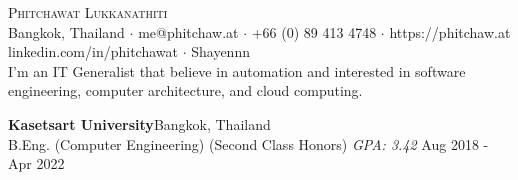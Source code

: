\vspace*{-40pt}

    

\vspace*{-10pt}
\begin{center}
	{\Huge \scshape {Phitchawat Lukkanathiti}}\\
	Bangkok, Thailand $\cdot$ me@phitchaw.at $\cdot$ +66 (0) 89 413 4748 $\cdot$ https://phitchaw.at \\
        \faLinkedinSquare \vspace{0.4mm} linkedin.com/in/phitchawat $\cdot$ \faGithub \vspace{0.4mm} Shayennn\\
        \vspace{4mm}
        I'm an IT Generalist that believe in automation and interested in software engineering, computer architecture, and cloud computing.
\end{center}
\vspace{2mm}

\textbf{Kasetsart University}\hfill Bangkok, Thailand\\
B.Eng. (Computer Engineering) (Second Class Honors) \textit{GPA: 3.42} \hfill Aug 2018 - Apr 2022\\
\vspace{2mm}

\vspace{1mm}

